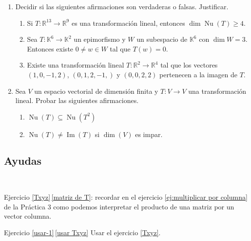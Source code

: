 \begin{enumerate}[resume, topsep=5pt,itemsep=.4cm]
 
\item Decidir si las siguientes afirmaciones son verdaderas o falsas. Justificar.
\begin{enumerate}
    \item  Si $T : \mathbb R^{13} \to \mathbb R^9$ es una transformación lineal, entonces $\dim \operatorname{Nu}(T) \geq  4$.
    \item Sea $T:\mathbb{K}^{6}\longrightarrow\mathbb{K}^2$ un epimorfismo y $W$ un subespacio de $\mathbb{K}^{6}$ con $\dim W=3$. Entonces existe $0\neq w\in W$ tal que $T(w)=0$.
    \item Existe una transformación lineal $T : \mathbb R^2 \to \mathbb R^4$ tal que los vectores $(1, 0, -1, 2)$, $(0, 1, 2,-1,)$ y $(0, 0, 2, 2)$ pertenecen a la imagen de $T$.
\end{enumerate}

\item Sea $V$ un espacio vectorial de dimensión finita y $T:V\longrightarrow V$ una transformación lineal. Probar las siguientes afirmaciones.
    \begin{multicols}{2}
        \begin{enumerate}
            \item $\operatorname{Nu}(T)\subseteq\operatorname{Nu}(T^2)$
            \item\label{dimV impar} $\operatorname{Nu}(T)\neq\operatorname{Im}(T)$ si $\dim(V)$ es impar.
        \end{enumerate}
    \end{multicols}



\end{enumerate}

\subsection*{Ayudas}

\ 

    Ejercicio \ref{Txyz}\,\ref{matriz de T}: recordar en el ejercicio \ref{ej:multiplicar por columna} de la Práctica 3 como podemos interpretar el producto de una matriz por un vector columna. 

    Ejercicio \ref{usar-1}\,\ref{usar Txyz} Usar el ejercicio \ref{Txyz}.


